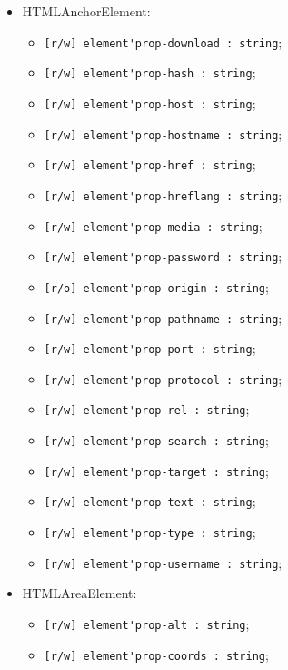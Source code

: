 \documentclass[a4paper, 14pt]{extarticle}
\newenvironment{icItems}
	{ \begin{itemize} [noitemsep,nolistsep] }
	{ \end{itemize} }
\begin{document}
\begin{icItems}
	\item HTMLAnchorElement:
	\begin{icItems}
		\item \lstinline|[r/w] element'prop-download : string|;
		\item \lstinline|[r/w] element'prop-hash : string|;
		\item \lstinline|[r/w] element'prop-host : string|;
		\item \lstinline|[r/w] element'prop-hostname : string|;
		\item \lstinline|[r/w] element'prop-href : string|;
		\item \lstinline|[r/w] element'prop-hreflang : string|;
		\item \lstinline|[r/w] element'prop-media : string|;
		\item \lstinline|[r/w] element'prop-password : string|;
		\item \lstinline|[r/o] element'prop-origin : string|;
		\item \lstinline|[r/w] element'prop-pathname : string|;
		\item \lstinline|[r/w] element'prop-port : string|;
		\item \lstinline|[r/w] element'prop-protocol : string|;
		\item \lstinline|[r/w] element'prop-rel : string|;
		\item \lstinline|[r/w] element'prop-search : string|;
		\item \lstinline|[r/w] element'prop-target : string|;
		\item \lstinline|[r/w] element'prop-text : string|;
		\item \lstinline|[r/w] element'prop-type : string|;
		\item \lstinline|[r/w] element'prop-username : string|;
	\end{icItems}
	
	\item HTMLAreaElement:
	\begin{icItems}
		\item \lstinline|[r/w] element'prop-alt : string|;
		\item \lstinline|[r/w] element'prop-coords : string|;
	\end{icItems}
	

\end{icItems}
\end{document}
